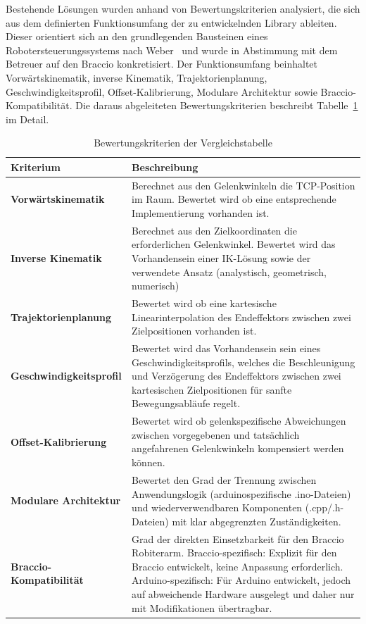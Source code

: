 \documentclass[12pt,a4paper]{article}
\begin{document}
Bestehende Lösungen wurden anhand von Bewertungskriterien analysiert, die sich aus dem definierten Funktionsumfang der zu entwickelnden Library ableiten. Dieser orientiert sich an den grundlegenden Bausteinen eines Robotersteuerungssystems nach Weber~\cite{Weber.2017} und wurde in Abstimmung mit dem Betreuer auf den Braccio konkretisiert. Der Funktionsumfang beinhaltet Vorwärtskinematik, inverse Kinematik, Trajektorienplanung, Geschwindigkeitsprofil, Offset-Kalibrierung, Modulare Architektur sowie Braccio-Kompatibilität. Die daraus abgeleiteten Bewertungskriterien beschreibt Tabelle~\ref{tab:bewertungskriterien} im Detail.

\begin{table}[h]
\centering
\caption{Bewertungskriterien der Vergleichstabelle}
\label{tab:bewertungskriterien}
\begin{tabularx}{\textwidth}{>{\bfseries}l X}
\toprule
Kriterium & Beschreibung \\
\midrule
Vorwärtskinematik 
  & Berechnet aus den Gelenkwinkeln die TCP-Position im Raum. Bewertet wird ob eine entsprechende Implementierung vorhanden ist. \\
\addlinespace
Inverse Kinematik 
  & Berechnet aus den Zielkoordinaten die erforderlichen Gelenkwinkel. Bewertet wird das Vorhandensein einer IK-Lösung sowie der verwendete Ansatz (analystisch, geometrisch, numerisch)  \\
\addlinespace
Trajektorienplanung 
  & Bewertet wird ob eine kartesische Linearinterpolation des Endeffektors zwischen zwei Zielpositionen vorhanden ist. \\
\addlinespace
Geschwindigkeitsprofil 
  & Bewertet wird das Vorhandensein sein eines Geschwindigkeitsprofils, welches die Beschleunigung und Verzögerung des Endeffektors zwischen zwei kartesischen Zielpositionen für sanfte Bewegungsabläufe regelt. \\
\addlinespace
Offset-Kalibrierung 
  & Bewertet wird ob gelenkspezifische Abweichungen zwischen vorgegebenen und tatsächlich angefahrenen Gelenkwinkeln kompensiert werden können. \\
\addlinespace
Modulare Architektur 
  & Bewertet den Grad der Trennung zwischen Anwendungslogik (arduinospezifische .ino-Dateien) und wiederverwendbaren Komponenten (.cpp/.h-Dateien) mit klar abgegrenzten Zuständigkeiten. \\
\addlinespace
Braccio-Kompatibilität 
  & Grad der direkten Einsetzbarkeit für den Braccio Robiterarm. 
  Braccio-spezifisch: Explizit für den Braccio entwickelt, keine Anpassung erforderlich.
  Arduino-spezifisch: Für Arduino entwickelt, jedoch auf abweichende Hardware ausgelegt und daher nur mit Modifikationen übertragbar.
     \\

\bottomrule
\end{tabularx}
\end{table}
\end{document}
